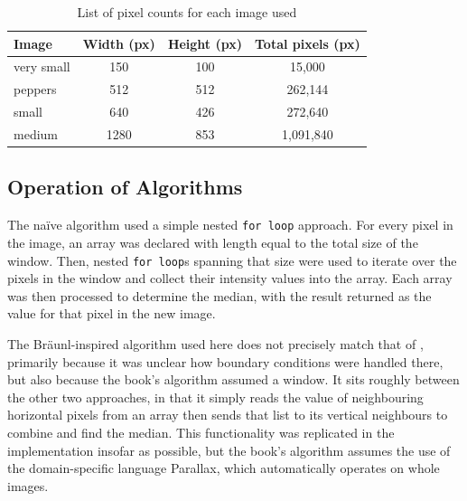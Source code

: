 \begin{table}
\centering
\begin{tabular}{@{}lccc@{}}
\toprule
\textbf{Image} & \multicolumn{1}{c}{\textbf{Width (px)}} & \multicolumn{1}{c}{\textbf{Height (px)}} & \multicolumn{1}{c}{\textbf{Total pixels (px)}} \\ \midrule
very small                         & 150                                     & 100                                      & 15,000                                         \\
peppers                            & 512                                     & 512                                      & 262,144                                        \\
small                              & 640                                     & 426                                      & 272,640                                        \\
medium                             & 1280                                    & 853                                      & 1,091,840                                      \\ \bottomrule
\end{tabular}
\caption{List of pixel counts for each image used}
\label{tab:median:pixelcounts}
\end{table}

\subsection{Operation of Algorithms}
The naïve algorithm used a simple nested \texttt{for loop} approach.  For every pixel in the image, an array was declared with length equal to the total size of the window.  Then, nested \texttt{for loop}s spanning that size were used to iterate over the pixels in the window and collect their intensity values into the array.  Each array was then processed to determine the median, with the result returned as the value for that pixel in the new image.

The Bräunl-inspired algorithm used here does not precisely match that of \cite{Braunl2001}, primarily because it was unclear how boundary conditions were handled there, but also because the book's algorithm assumed a  window.  It sits roughly between the other two approaches, in that it simply reads the value of neighbouring horizontal pixels from an array then sends that list to its vertical neighbours to combine and find the median.  This functionality was replicated in the implementation insofar as possible, but the book's algorithm assumes the use of the domain-specific language Parallax, which automatically operates on whole images.

